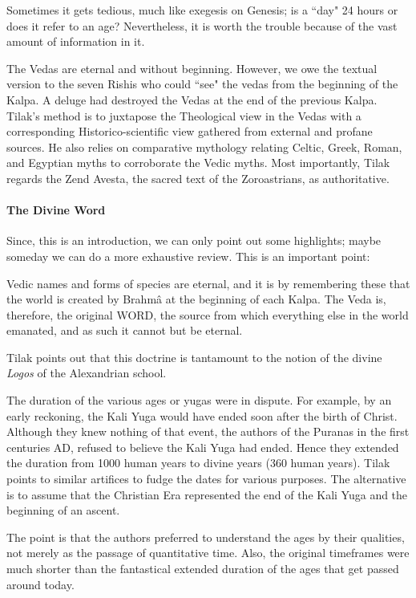 Sometimes it gets tedious, much like exegesis on Genesis; is a ``day" 24 hours or does it refer to an age? Nevertheless, it is worth the trouble because of the vast amount of information in it.

The Vedas are eternal and without beginning. However, we owe the textual version to the seven Rishis who could ``see" the vedas from the beginning of the Kalpa. A deluge had destroyed the Vedas at the end of the previous Kalpa. Tilak's method is to juxtapose the Theological view in the Vedas with a corresponding Historico-scientific view gathered from external and profane sources. He also relies on comparative mythology relating Celtic, Greek, Roman, and Egyptian myths to corroborate the Vedic myths. Most importantly, Tilak regards the Zend Avesta, the sacred text of the Zoroastrians, as authoritative.

\paragraph{The Divine Word}
Since, this is an introduction, we can only point out some highlights; maybe someday we can do a more exhaustive review. This is an important point:

\begin{quotex}
Vedic names and forms of species are eternal, and it is by remembering these that the world is created by Brahmâ at the beginning of each Kalpa. The Veda is, therefore, the original WORD, the source from which everything else in the world emanated, and as such it cannot but be eternal. 

\end{quotex}
Tilak points out that this doctrine is tantamount to the notion of the divine \emph{Logos} of the Alexandrian school.

The duration of the various ages or yugas were in dispute. For example, by an early reckoning, the Kali Yuga would have ended soon after the birth of Christ. Although they knew nothing of that event, the authors of the Puranas in the first centuries AD, refused to believe the Kali Yuga had ended. Hence they extended the duration from 1000 human years to divine years (360 human years). Tilak points to similar artifices to fudge the dates for various purposes. The alternative is to assume that the Christian Era represented the end of the Kali Yuga and the beginning of an ascent.

The point is that the authors preferred to understand the ages by their qualities, not merely as the passage of quantitative time. Also, the original timeframes were much shorter than the fantastical extended duration of the ages that get passed around today.

